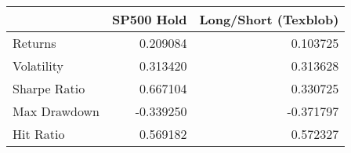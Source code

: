\begin{tabular}{lrr}
\toprule
{} &  SP500 Hold &  Long/Short (Texblob) \\
\midrule
Returns      &    0.209084 &              0.103725 \\
Volatility   &    0.313420 &              0.313628 \\
Sharpe Ratio &    0.667104 &              0.330725 \\
Max Drawdown &   -0.339250 &             -0.371797 \\
Hit Ratio    &    0.569182 &              0.572327 \\
\bottomrule
\end{tabular}
